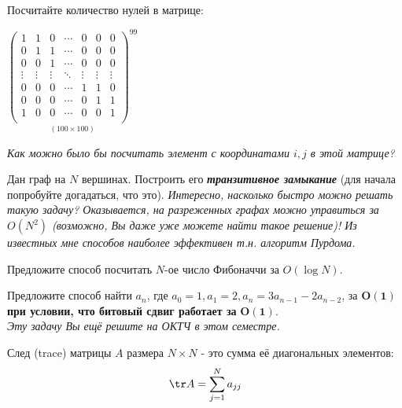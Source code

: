 	\begin{problem}{
		Посчитайте количество нулей в матрице: \\
			\centerline{
				$\underset{(100 \times 100)}{\begin{pmatrix}
					1 & 1 & 0 & \cdots & 0 & 0 & 0 \\
					0 & 1 & 1 & \cdots & 0 & 0 & 0 \\
					0 & 0 & 1 & \cdots & 0 & 0 & 0 \\
					\vdots & \vdots & \vdots  & \ddots & \vdots & \vdots & \vdots \\
					0 & 0 & 0 & \cdots & 1 & 1 & 0 \\
					0 & 0 & 0 & \cdots & 0 & 1 & 1 \\
					1 & 0 & 0 & \cdots & 0 & 0 & 1  \\
				\end{pmatrix}^{99}}$
			}
		\textit{Как можно было бы посчитать элемент с координатами $i, j$ в этой матрице?}
		
	}\end{problem}

	\begin{problem}
		Дан граф на $N$ вершинах. Построить его \textit{\textbf{транзитивное замыкание}} (для начала попробуйте догадаться, что это).
		\textit{Интересно, насколько быстро можно решать такую задачу? Оказывается, на разреженных графах можно управиться за $O(N^2)$ (возможно, Вы даже уже можете найти такое решение)! Из известных мне способов наиболее эффективен т.н. алгоритм Пурдома.}
	\end{problem}


	\begin{problem}
		Предложите способ посчитать $N$-ое число Фибоначчи за $O(\log N)$. 	
	\end{problem}
	
	\begin{problem}
		Предложите способ найти $a_n$, где $a_0 = 1, a_1 = 2, a_n = 3a_{n-1} - 2a_{n-2}$, за $\mathbf{O(1)}$ \textbf{при условии, что битовый сдвиг работает за} $\mathbf{O(1)}$.
		\\
		\textit{Эту задачу Вы ещё решите на ОКТЧ в этом семестре.}
	\end{problem}

	
	\begin{definition}
		След (trace) матрицы $A$ размера $N \times N$ - это сумма её диагональных элементов: 
		$$ \tr A = \sum_{j=1}^{N} a_{jj}$$
	\end{definition}

